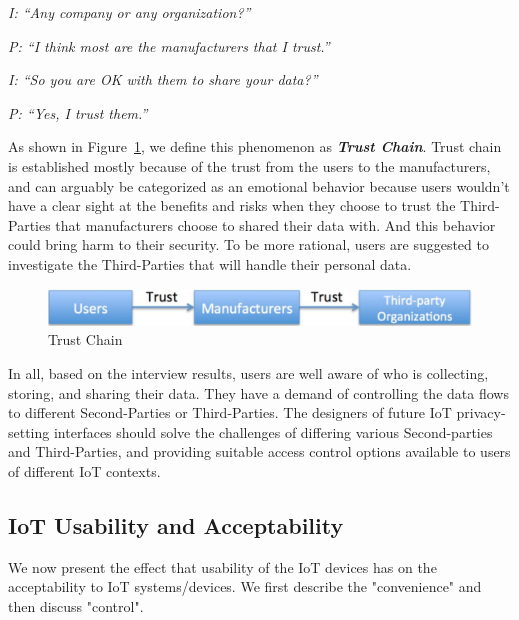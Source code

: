 \textit{I: ``Any company or any organization?''\\}

\textit{P: ``I think most are the manufacturers that I trust.''\\}

\textit{I: ``So you are OK with them to share your data?''\\}

\textit{P: ``Yes, I trust them.''\\}

As shown in Figure~\ref{fig:trustchain}, we define this phenomenon as \textit{\textbf{Trust Chain}}. Trust chain is established mostly because of the trust from the users to the manufacturers, and can arguably be categorized as an emotional behavior because users wouldn't have a clear sight at the benefits and risks when they choose to trust the Third-Parties that manufacturers choose to shared their data with. And this behavior could bring harm to their security. To be more rational, users are suggested to investigate the Third-Parties that will handle their personal data.

\begin{figure}
	\centering
	\includegraphics[width=0.75\columnwidth]{figures/trustchain.pdf}
	\caption{Trust Chain}
	\label{fig:trustchain}
\end{figure}

In all, based on the interview results, users are well aware of who is collecting, storing, and sharing their data. They have a demand of controlling the data flows to different Second-Parties or Third-Parties. The designers of future IoT privacy-setting interfaces should solve the challenges of differing various Second-parties and Third-Parties, and providing suitable access control options available to users of different IoT contexts.

\subsection{IoT Usability and Acceptability}
We now present the effect that usability of the IoT devices has on the acceptability to IoT systems/devices. We first describe the "convenience" and then discuss "control".

